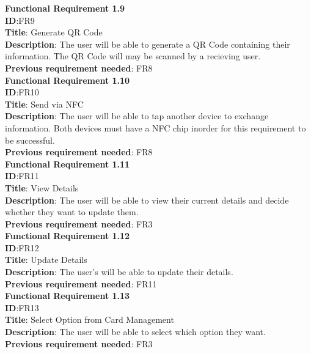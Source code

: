\documentclass[english]{article}
\begin{document}
				\textbf{Functional Requirement 1.9}\\
				\textbf{ID}:FR9\\
				\textbf{Title}: Generate QR Code\\
				\textbf{Description}: The user will be able to generate a QR Code containing their information. The QR Code will may be scanned by a recieving user.\\
				\textbf{Previous requirement needed}: FR8\\
				
				\textbf{Functional Requirement 1.10}\\
				\textbf{ID}:FR10\\
				\textbf{Title}: Send via NFC\\
				\textbf{Description}: The user will be able to tap another device to exchange information. Both devices must have a NFC chip inorder for this requirement to be successful.\\
				\textbf{Previous requirement needed}: FR8\\
				
				\textbf{Functional Requirement 1.11}\\
				\textbf{ID}:FR11\\
				\textbf{Title}: View Details\\
				\textbf{Description}: The user will be able to view their current details and decide whether they want to update them.\\
				\textbf{Previous requirement needed}: FR3\\
				
				\textbf{Functional Requirement 1.12}\\
				\textbf{ID}:FR12\\
				\textbf{Title}: Update Details\\
				\textbf{Description}: The user's will be able to update their details.\\
				\textbf{Previous requirement needed}: FR11\\
				
				\textbf{Functional Requirement 1.13}\\
				\textbf{ID}:FR13\\
				\textbf{Title}: Select Option from Card Management\\
				\textbf{Description}: The user will be able to select which option they want.\\
				\textbf{Previous requirement needed}: FR3\\
				
\end{document}
